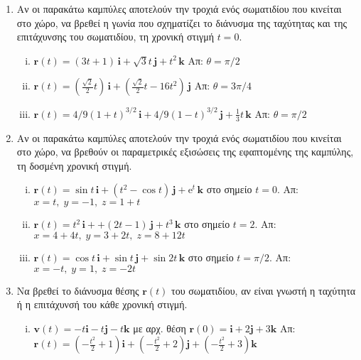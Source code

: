 \documentclass[a4paper,table]{report}
\begin{document}
\begin{enumerate}
  \item Αν οι παρακάτω καμπύλες αποτελούν την τροχιά ενός σωματιδίου που κινείται 
    στο χώρο, να βρεθεί η γωνία που σχηματίζει το διάνυσμα της ταχύτητας και της 
    επιτάχυνσης του σωματιδίου, τη χρονική στιγμή $ t=0 $.
    \begin{enumerate}[i)]
      \item $ \mathbf{r}(t)=(3t+1)\, \mathbf{i} + \sqrt{3} t\, \mathbf{j} + t^{2} \, 
        \mathbf{k} $
        \hfill Απ: $ \theta = \pi /2 $
      \item $ \mathbf{r}(t)=(\frac{\sqrt{2}}{2} t)\, \mathbf{i} + 
        (\frac{\sqrt{2}}{2} t-16t^{2})\, \mathbf{j} $
        \hfill Απ: $ \theta = 3\pi /4 $ 
      \item $ \mathbf{r}(t)=4/9(1+t)^{3/2}\, \mathbf{i} + 4/9(1-t)^{3/2}\, \mathbf{j} + 
        \frac{1}{3} t\, \mathbf{k} $
        \hfill Απ: $ \theta = \pi /2 $ 
    \end{enumerate}

  \item Αν οι παρακάτω καμπύλες αποτελούν την τροχιά ενός σωματιδίου που κινείται 
    στο χώρο, να βρεθούν οι παραμετρικές εξισώσεις της εφαπτομένης της καμπύλης, τη 
    δοσμένη χρονική στιγμή.
    \begin{enumerate}[i)]
      \item $ \mathbf{r}(t)= \sin{t}\, \mathbf{i} + (t^{2}- \cos{t})\, \mathbf{j} +
        \mathrm{e}^{t} \, \mathbf{k} $ στο σημείο $ t=0 $.
        \hfill Απ: $ x=t,\;y=-1,\;z=1+t $ 
      \item $ \mathbf{r}(t)=t^{2}\, \mathbf{i} + +(2t-1)\, \mathbf{j} + t^3 \, \mathbf{k}
        $ στο σημείο $ t=2 $.
        \hfill Απ: $ x=4+4t,\;y=3+2t,\;z=8+12t $
      \item $ \mathbf{r}(t)= \cos{t}\, \mathbf{i} + \sin{t}\, \mathbf{j} + \sin{2t} \,
        \mathbf{k} $ στο σημείο $ t= \pi /2 $. 
        \hfill Απ: $ x=-t,\;y= 1,\; z=-2t $
    \end{enumerate}

  \item Να βρεθεί το διάνυσμα θέσης $ \mathbf{r}(t) $ του σωματιδίου, αν είναι γνωστή η
    ταχύτητα ή η επιτάχυνσή του κάθε χρονική στιγμή.
    \begin{enumerate}[i)]
      \item $ \mathbf{v}(t) = -t \mathbf{i}- t \mathbf{j}- t \mathbf{k} $ με αρχ.
        θέση $ \mathbf{r}(0)= \mathbf{i}+2 \mathbf{j}+3 \mathbf{k} $
        \hfill Απ: $ \mathbf{r}(t) = (-\frac{t^{2}}{2} +1) \mathbf{i}+(-
        \frac{t^{2}}{2} +2) \mathbf{j}+ (- \frac{t^{2}}{2} +3) \mathbf{k} $ 


\end{enumerate}
\end{enumerate}
\end{document}
